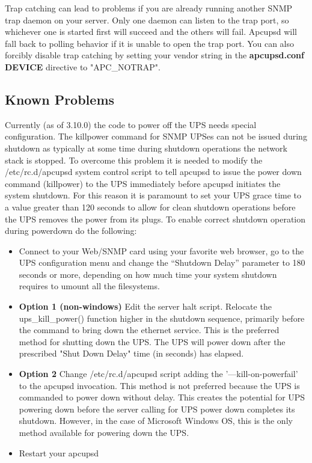 {{{{{{{Trap catching can lead to problems if you are already running another SNMP
trap daemon on your server. Only one daemon can listen to the trap port, so
whichever one is started first will succeed and the others will fail. Apcupsd
will fall back to polling behavior if it is unable to open the trap port. You
can also forcibly disable trap catching by setting your vendor string in the
{\bf apcupsd.conf} {\bf DEVICE} directive to "APC\_NOTRAP".

\label{Known-Problems}

\subsection*{Known Problems}

Currently (as of 3.10.0) the code to power off the UPS needs special
configuration. The killpower command for SNMP UPSes can not be issued during
shutdown as typically at some time during shutdown operations the network
stack is stopped. To overcome this problem it is needed to modify the
/etc/rc.d/apcupsd system control script to tell apcupsd to issue the power
down command (killpower) to the UPS immediately before apcupsd initiates the
system shutdown. For this reason it is paramount to set your UPS grace time to
a value greater than 120 seconds to allow for clean shutdown operations before
the UPS removes the power from its plugs. To enable correct shutdown operation
during powerdown do the following:  

\begin{itemize}
\item Connect to your Web/SNMP card using your favorite web browser, go to the
   UPS configuration menu and change the ``Shutdown Delay'' parameter to 180
   seconds or more, depending on how much time your system shutdown requires to
umount all the filesystems.
\item {\bf Option 1 (non-windows)} Edit the server halt script.  Relocate the 
ups\_kill\_power() function higher in the shutdown sequence, primarily before
the command to bring down the ethernet service. This is the preferred method
for shutting down the UPS.  The UPS will power down after the prescribed
"Shut Down Delay" time (in seconds) has elapsed.
\item {\bf Option 2} Change /etc/rc.d/apcupsd script adding the '{---}kill-on-powerfail'
to the apcupsd invocation.  This method is not preferred because the UPS is
commanded to power down without delay.  This creates the potential for UPS
powering down before the server calling for UPS power down completes its shutdown.
However, in the case of Microsoft Windows OS, this is the only method available
for powering down the UPS.
\item Restart your apcupsd 
   \end{itemize}

}}}}}}}
